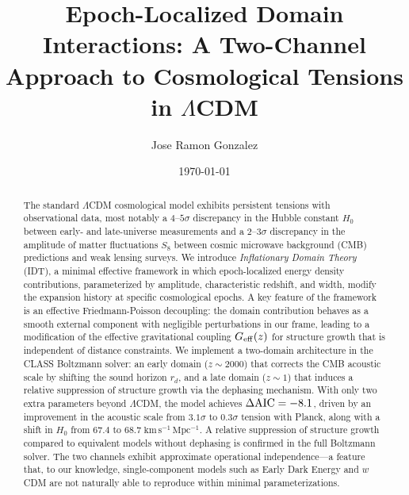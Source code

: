 \documentclass[aps,prd,twocolumn,superscriptaddress,nofootinbib]{revtex4-2}
\newcommand{\LCDM}{$\Lambda$CDM}
\newcommand{\Geff}{G_{\rm eff}}
\newcommand{\dAIC}{\Delta{\rm AIC}}
\begin{document}
\title{Epoch-Localized Domain Interactions: A Two-Channel Approach to Cosmological Tensions in \LCDM}

\author{Jose Ramon Gonzalez}

\date{\today}

\begin{abstract}
The standard $\Lambda$CDM cosmological model exhibits persistent tensions 
with observational data, most notably a $4$--$5\sigma$ discrepancy in the 
Hubble constant $H_0$ between early- and late-universe measurements and a 
$2$--$3\sigma$ discrepancy in the amplitude of matter fluctuations $S_8$ 
between cosmic microwave background (CMB) predictions and weak lensing 
surveys. We introduce \emph{Inflationary Domain Theory} (IDT), a minimal 
effective framework in which epoch-localized energy density contributions, 
parameterized by amplitude, characteristic redshift, and width, modify the 
expansion history at specific cosmological epochs. A key feature of the 
framework is an effective Friedmann-Poisson decoupling: the domain 
contribution behaves as a smooth external component with negligible 
perturbations in our frame, leading to a modification of the effective 
gravitational coupling $\Geff(z)$ for structure growth that is independent 
of distance constraints. We implement a two-domain architecture in the 
CLASS Boltzmann solver: an early domain ($z \sim 2000$) that corrects the 
CMB acoustic scale by shifting the sound horizon $r_d$, and a late domain 
($z \sim 1$) that induces a relative suppression of structure growth via 
the dephasing mechanism. With only two extra parameters beyond $\Lambda$CDM, 
the model achieves $\dAIC = -8.1$, driven by an improvement in the acoustic 
scale from $3.1\sigma$ to $0.3\sigma$ tension with Planck, along with a 
shift in $H_0$ from $67.4$ to $68.7\;\mathrm{km\,s^{-1}\,Mpc^{-1}}$. A 
relative suppression of structure growth compared to equivalent models 
without dephasing is confirmed in the full Boltzmann solver. The two 
channels exhibit approximate operational independence---a feature that, to 
our knowledge, single-component models such as Early Dark Energy and $w$CDM 
are not naturally able to reproduce within minimal parameterizations.
\end{abstract}

\maketitle
\end{document}
